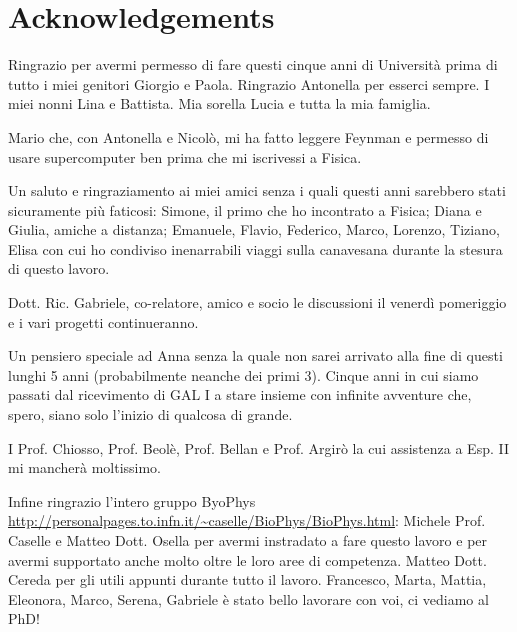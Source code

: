 \chapter*{Acknowledgements}
Ringrazio per avermi permesso di fare questi cinque anni di Università prima di tutto i miei genitori Giorgio e Paola.
Ringrazio Antonella per esserci sempre. I miei nonni Lina e Battista. Mia sorella Lucia e tutta la mia famiglia.

Mario che, con Antonella e Nicolò, mi ha fatto leggere Feynman e permesso di usare supercomputer ben prima che mi iscrivessi a Fisica.

Un saluto e ringraziamento ai miei amici senza i quali questi anni sarebbero stati sicuramente più faticosi: Simone, il primo che ho incontrato a Fisica; Diana e Giulia, amiche a distanza; Emanuele, Flavio, Federico, Marco, Lorenzo, Tiziano, Elisa con cui ho condiviso inenarrabili viaggi sulla canavesana durante la stesura di questo lavoro.

Dott. Ric. Gabriele, co-relatore, amico e socio le discussioni il venerdì pomeriggio e i vari progetti continueranno.

Un pensiero speciale ad Anna senza la quale non sarei arrivato alla fine di questi lunghi 5 anni (probabilmente neanche dei primi 3). Cinque anni in cui siamo passati dal ricevimento di GAL I a stare insieme con infinite avventure che, spero, siano solo l'inizio di qualcosa di grande.

I Prof. Chiosso, Prof. Beolè, Prof. Bellan e Prof. Argirò la cui assistenza a Esp. II mi mancherà moltissimo.

Infine ringrazio l'intero gruppo ByoPhys \\ \url{http://personalpages.to.infn.it/~caselle/BioPhys/BioPhys.html}: Michele Prof. Caselle e Matteo Dott. Osella per avermi instradato a fare questo lavoro e per avermi supportato anche molto oltre le loro aree di competenza. Matteo Dott. Cereda per gli utili appunti durante tutto il lavoro.
Francesco, Marta, Mattia, Eleonora, Marco, Serena, Gabriele è stato bello lavorare con voi, ci vediamo al PhD!
